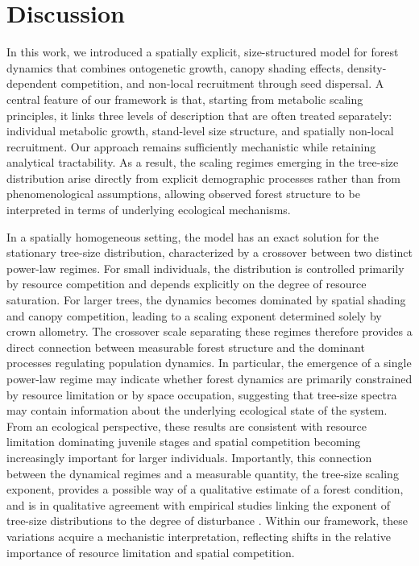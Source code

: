 \documentclass[aps,pre,twocolumn,superscriptaddress,10pt]{revtex4-2}
\begin{document}
\section*{Discussion}
In this work, we introduced a spatially explicit, size-structured model for forest dynamics that combines ontogenetic growth, canopy shading effects, density-dependent competition, and non-local recruitment through seed dispersal. 
A central feature of our framework is that, starting from metabolic scaling principles, it links three levels of description that are often treated separately: individual metabolic growth, stand-level size structure, and spatially non-local recruitment. Our approach remains sufficiently mechanistic while retaining analytical tractability. As a result, the scaling regimes emerging in the tree-size distribution arise directly from explicit demographic processes rather than from phenomenological assumptions, allowing observed forest structure to be interpreted in terms of underlying ecological mechanisms.
 
In a spatially homogeneous setting, the model has an exact solution for the stationary tree-size distribution, characterized by a crossover between two distinct power-law regimes. For small individuals, the distribution is controlled primarily by resource competition and depends explicitly on the degree of resource saturation. For larger trees, the dynamics becomes dominated by spatial shading and canopy competition, leading to a scaling exponent determined solely by crown allometry. The crossover scale separating these regimes therefore provides a direct connection between measurable forest structure and the dominant processes regulating population dynamics. In particular, the emergence of a single power-law regime may indicate whether forest dynamics are primarily constrained by resource limitation or by space occupation, suggesting that tree-size spectra may contain information about the underlying ecological state of the system.
From an ecological perspective, these results are consistent with resource limitation dominating juvenile stages \cite{Kobe1995, Nathan2000,PoorterKitajima2007,Chen2020,Treep2021} and spatial competition becoming increasingly important for larger individuals. Importantly, this connection between the dynamical regimes and a measurable quantity, the tree-size scaling exponent, provides a possible way of a qualitative estimate of a forest condition, and is in qualitative agreement with empirical studies linking the exponent of tree-size distributions to the degree of disturbance \cite{Anfodillo_2013,Sellan_Simini_2017,Eichenwald_2025}. Within our framework, these variations acquire a mechanistic interpretation, reflecting shifts in the relative importance of resource limitation and spatial competition.
\end{document}
